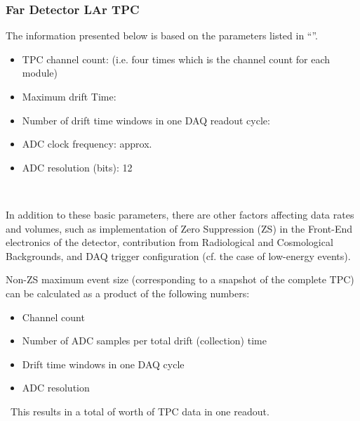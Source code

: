 
\subsubsection{Far Detector LAr TPC}
The information presented below is based on the parameters listed in
``\anxrates''.
\begin{itemize}
\item TPC channel count: \dunenumberchannels (i.e. four times
  \daqchannelsperdetector which is the channel count for each \tpcdetectormass module)
\item Maximum drift Time: \tpcdrifttime
\item Number of drift time windows in one DAQ readout cycle: \daqdriftsperreadout
\item ADC clock frequency: approx. \daqsamplerate
\item ADC resolution (bits): 12
\end{itemize}
\

In addition to these basic parameters, there are other factors affecting data rates and volumes, such as
implementation of Zero Suppression (ZS)  in the Front-End electronics of the detector, contribution from
Radiological and Cosmological Backgrounds, and DAQ trigger configuration (cf. the case of low-energy events).

Non-ZS maximum event size (corresponding to a snapshot of the complete TPC) can be calculated as a product of the following numbers:
\begin{itemize}
\item Channel count
\item Number of ADC samples per total drift (collection) time
\item Drift time windows in one DAQ cycle
\item ADC resolution
\end{itemize}
\
This results in a total of \dunefsreadoutsize worth of TPC data in one readout.

